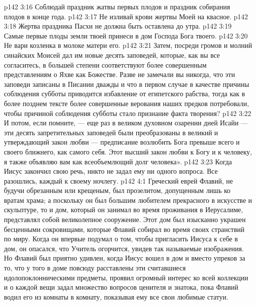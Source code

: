 \vs p142 3:16 \bibnobreakspace Соблюдай праздник жатвы первых плодов и праздник собирания плодов в конце года.
\vs p142 3:17 \bibnobreakspace Не изливай крови жертвы Моей на квасное.
\vs p142 3:18 \bibnobreakspace Жертва праздника Пасхи не должна быть оставлена до утра.
\vs p142 3:19 \bibnobreakspace Самые первые плоды земли твоей принеси в дом Господа Бога твоего.
\vs p142 3:20 \bibnobreakspace Не вари козленка в молоке матери его.
\vs p142 3:21 \pc Затем, посреди громов и молний синайских Моисей дал им новые десять заповедей, которые, как вы все согласитесь, в большей степени соответствуют более совершенным представлениям о Яхве как Божестве. Разве не замечали вы никогда, что эти заповеди записаны в Писании дважды и что в первом случае в качестве причины соблюдения субботы приводится избавление от египетского рабства, тогда как в более позднем тексте более совершенные верования наших предков потребовали, чтобы причиной соблюдения субботы стало признание факта творения?
\vs p142 3:22 И потом, если помните, --- еще раз в великом духовном озарении дней Исайи --- эти десять запретительных заповедей были преобразованы в великий и утверждающий закон любви --- предписание возлюбить Бога превыше всего и своего ближнего, как самого себя. Этот высший закон любви к Богу и к человеку, я также объявляю вам как всеобъемлющий долг человека».
\vs p142 3:23 \pc Когда Иисус закончил свою речь, никто не задал ему ни одного вопроса. Все разошлись, каждый к своему ночлегу.
\vs p142 4:1 Греческий еврей Флавий, не будучи обрезанным или крещеным, был прозелитом, допущенным лишь ко вратам храма; а поскольку он был большим любителем прекрасного в искусстве и скульптуре, то и дом, который он занимал во время проживания в Иерусалиме, представлял собой великолепное сооружение. Этот дом был изысканно украшен бесценными сокровищами, которые Флавий собирал во время своих странствий по миру. Когда он впервые подумал о том, чтобы пригласить Иисуса к себе в дом, он опасался, что Учитель огорчится, увидев так называемые изображения. Но Флавий был приятно удивлен, когда Иисус вошел в дом и вместо упреков за то, что у того в доме повсюду расставлены эти считавшиеся идолопоклонническими предметы, проявил огромный интерес ко всей коллекции и о каждой вещи задал множество вопросов ценителя и знатока, пока Флавий водил его из комнаты в комнату, показывая ему все свои любимые статуи.
